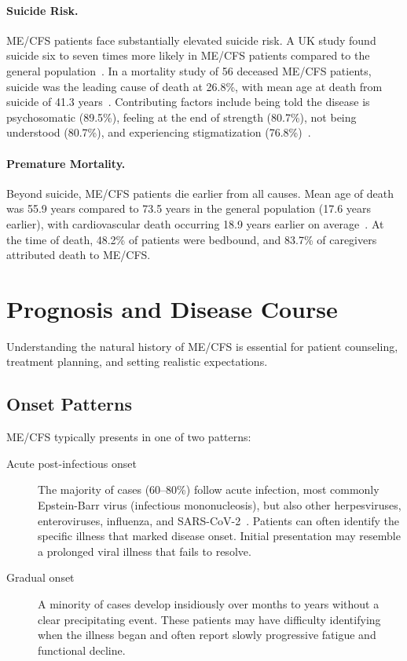 \paragraph{Suicide Risk.}
ME/CFS patients face substantially elevated suicide risk. A UK study found suicide six to seven times more likely in ME/CFS patients compared to the general population~\cite{Roberts2016}. In a mortality study of 56 deceased ME/CFS patients, suicide was the leading cause of death at 26.8\%, with mean age at death from suicide of 41.3 years~\cite{McManimen2016mortality}. Contributing factors include being told the disease is psychosomatic (89.5\%), feeling at the end of strength (80.7\%), not being understood (80.7\%), and experiencing stigmatization (76.8\%)~\cite{Konig2024mental}.

\paragraph{Premature Mortality.}
Beyond suicide, ME/CFS patients die earlier from all causes. Mean age of death was 55.9 years compared to 73.5 years in the general population (17.6 years earlier), with cardiovascular death occurring 18.9 years earlier on average~\cite{McManimen2016mortality}. At the time of death, 48.2\% of patients were bedbound, and 83.7\% of caregivers attributed death to ME/CFS.

\section{Prognosis and Disease Course}
\label{sec:prognosis-course}

Understanding the natural history of ME/CFS is essential for patient counseling, treatment planning, and setting realistic expectations.

\subsection{Onset Patterns}
\label{subsec:onset}

ME/CFS typically presents in one of two patterns:
\begin{description}
    \item[Acute post-infectious onset] The majority of cases (60--80\%) follow acute infection, most commonly Epstein-Barr virus (infectious mononucleosis), but also other herpesviruses, enteroviruses, influenza, and SARS-CoV-2~\cite{Hickie2006postinfectious}. Patients can often identify the specific illness that marked disease onset. Initial presentation may resemble a prolonged viral illness that fails to resolve.
    \item[Gradual onset] A minority of cases develop insidiously over months to years without a clear precipitating event. These patients may have difficulty identifying when the illness began and often report slowly progressive fatigue and functional decline.
\end{description}

